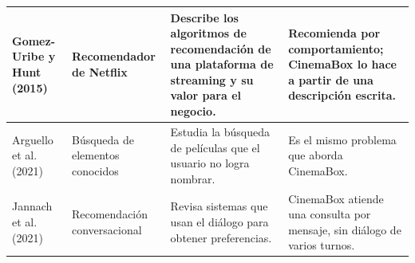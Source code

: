 \begin{landscape}
\begin{table}[H]
\begin{tabularx}{\columnwidth}{|p{2.6cm}|p{2.8cm}|X|X|}
        Gomez-Uribe y Hunt (2015) \cite{gomezuribe2015netflix} &
        Recomendador de Netflix &
        Describe los algoritmos de recomendación de una plataforma de streaming y su valor para el negocio. &
        Recomienda por comportamiento; CinemaBox lo hace a partir de una descripción escrita. \\
        \hline

        Arguello et al. (2021) \cite{arguello2021tot} &
        Búsqueda de elementos conocidos &
        Estudia la búsqueda de películas que el usuario no logra nombrar. &
        Es el mismo problema que aborda CinemaBox. \\
        \hline

        Jannach et al. (2021) \cite{jannach2021crs} &
        Recomendación conversacional &
        Revisa sistemas que usan el diálogo para obtener preferencias. &
        CinemaBox atiende una consulta por mensaje, sin diálogo de varios turnos. \\
        \hline
    \end{tabularx}
\end{table}
\end{landscape}